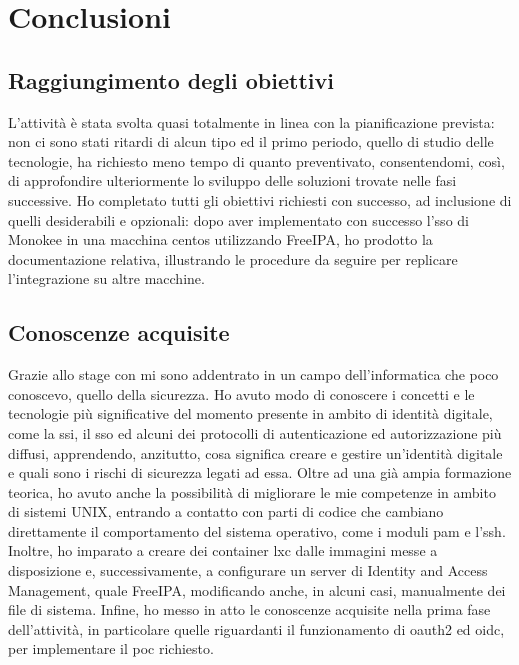 
\chapter{Conclusioni}
\label{cap:conclusioni}

\section{Raggiungimento degli obiettivi}

L'attività è stata svolta quasi totalmente in linea con la pianificazione prevista: non ci sono stati ritardi di alcun tipo ed il primo periodo, quello di studio delle tecnologie, ha richiesto meno tempo di quanto preventivato, consentendomi, così, di approfondire ulteriormente lo sviluppo delle soluzioni trovate nelle fasi successive.
Ho completato tutti gli obiettivi richiesti con successo, ad inclusione di quelli desiderabili e opzionali: dopo aver implementato con successo l'\acrshort{sso} di Monokee in una macchina \acrshort{centos} utilizzando FreeIPA, ho prodotto la documentazione relativa, illustrando le procedure da seguire per replicare l'integrazione su altre macchine.

\section{Conoscenze acquisite}

Grazie allo stage con \myAzienda mi sono addentrato in un campo dell'informatica che poco conoscevo, quello della sicurezza. Ho avuto modo di conoscere i concetti e le tecnologie più significative del momento presente in ambito di identità digitale, come la \acrshort{ssi}, il \acrshort{sso} ed alcuni dei protocolli di autenticazione ed autorizzazione più diffusi, apprendendo, anzitutto, cosa significa creare e gestire un'identità digitale e quali sono i rischi di sicurezza legati ad essa. Oltre ad una già ampia formazione teorica, ho avuto anche la possibilità di migliorare le mie competenze in ambito di sistemi UNIX, entrando a contatto con parti di codice che cambiano direttamente il comportamento del sistema operativo, come i moduli \acrshort{pam} e l'\acrshort{ssh}.
Inoltre, ho imparato a creare dei container \acrshort{lxc} dalle immagini messe a disposizione e, successivamente, a configurare un server di Identity and Access Management, quale FreeIPA, modificando anche, in alcuni casi, manualmente dei file di sistema.
Infine, ho messo in atto le conoscenze acquisite nella prima fase dell'attività, in particolare quelle riguardanti il funzionamento di \acrshort{oauth2} ed \acrshort{oidc}, per implementare il \acrfull{poc} richiesto. 

